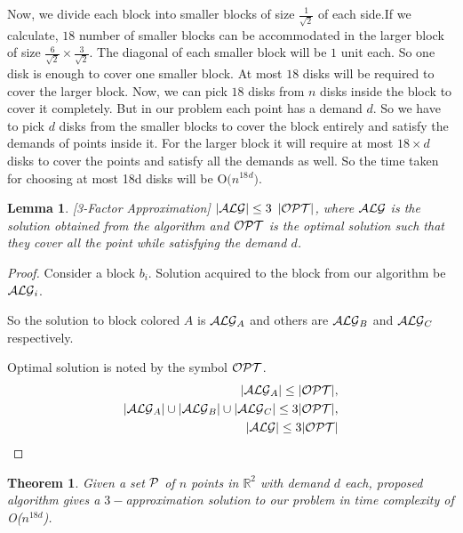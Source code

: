 \documentclass[a4paper,10pt]{article}  %
\newtheorem{theorem}{Theorem}
\newtheorem{lemma}{Lemma}
\begin{document}
	
	
	Now, we divide each block into smaller blocks of size $\frac{1}{\sqrt{2}}$ of each side.If we calculate, $18$ number of smaller blocks can be accommodated in the larger block of size $\frac{6}{\sqrt{2}} \times  \frac{3}{\sqrt{2}}$. The diagonal of each smaller block will be $1$ unit each. So one disk is enough to cover one smaller block. At most $18$ disks will be required to cover the larger block. Now, we can pick $18$ disks from $n$ disks inside the block to cover it completely. But in our problem each point has a demand $d$. So we have to pick $d$ disks from the smaller blocks to cover the block entirely and satisfy the demands of points inside it. For the larger block it will require at most $18 \times d$ disks to cover the points and satisfy all the demands as well. So the time taken for choosing at most 18d disks will be  O$(n^{18}$$^d)$.
	
	
	
	\begin{lemma}\label{sq}[3-Factor Approximation]
			$|{\cal ALG}| \leq 3$ $|{\cal OPT}|$, where ${\cal ALG}$ is the solution obtained from the algorithm and ${\cal OPT}$ is the optimal solution such that they cover all the point while satisfying the demand $d$.
	\end{lemma}
	
	\begin{proof}
		Consider a block $b_i$. Solution acquired to the block from our algorithm be ${\cal ALG}_i$.
		
		So the solution to block colored $A$ is ${\cal ALG}_A$ and others are ${\cal ALG}_B$ and ${\cal ALG}_C$ respectively. 
		
		Optimal solution is noted by the symbol ${\cal OPT}$.
		\begin{align*} 
		|{\cal ALG}_A|\leq |{\cal OPT}|,\\ 
		|{\cal ALG}_A|\cup|{\cal ALG}_B|\cup|{\cal ALG}_C|\leq 3|{\cal OPT}|,\\
		|{\cal ALG}|\leq 3|{\cal OPT}|
		\end{align*}%
	\end{proof}
	
	\theoremstyle{theorem}
	\begin{theorem}
		Given a set ${\cal P}$ of $n$ points in $\mathbb{R}^2$ with demand $d$ each, proposed algorithm gives a $3 - $approximation solution to our problem in time complexity of O($n^{18d}$).
	\end{theorem}
	
\end{document}
